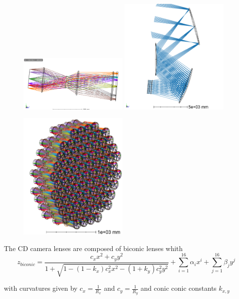 \documentclass{article}
\begin{document}
\begin{figure}
	\includegraphics[width=0.48\textwidth]{TMP_cam1_layout.PNG}
	\includegraphics[width=0.48\textwidth]{TMP_3DLayout.png}
	
	\includegraphics[width=0.48\textwidth]{TMP_cams.PNG}
\end{figure}

The CD camera lenses are composed of biconic lenses whith \begin{equation}
	z_{biconic} = \frac{c_x x^2 + c_y y^2}{1+ \sqrt{1-(1-k_x)c_x^2 x^2-(1+k_y)c_y^2y^2}} + \sum_{i=1}^{16} \alpha_i x^i + \sum_{j=1}^{16} \beta_j y^j 
\end{equation}

with curvatures given by  $c_x=\frac{1}{R_x}$ and $c_y=\frac{1}{R_y}$ and conic conic constants $k_{x,y}$
\end{document}
